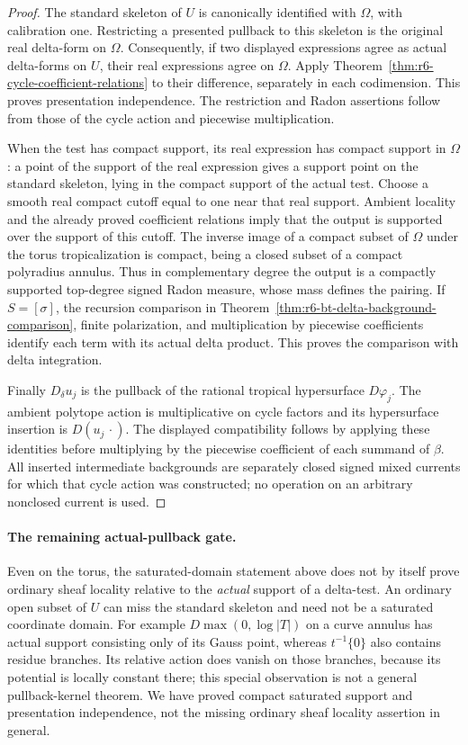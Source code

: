 \documentclass[11pt,a4paper]{article}
\numberwithin{equation}{section}
\theoremstyle{definition}
\theoremstyle{remark}
\begin{document}
\begin{proof}
The standard skeleton of $U$ is canonically identified with
$\Omega$, with calibration one.  Restricting a presented pullback
to this skeleton is the original real delta-form on $\Omega$.
Consequently, if two displayed expressions agree as actual
delta-forms on $U$, their real expressions agree on $\Omega$.
Apply Theorem~\ref{thm:r6-cycle-coefficient-relations} to their
difference, separately in each codimension.  This proves
presentation independence.  The restriction and Radon assertions
follow from those of the cycle action and piecewise multiplication.

When the test has compact support, its real expression has compact
support in $\Omega$: a point of the support of the real expression
gives a support point on the standard skeleton, lying in the
compact support of the actual test.  Choose a smooth real compact
cutoff equal to one near that real support.  Ambient locality and
the already proved coefficient relations imply that the output is
supported over the support of this cutoff.  The inverse image of
a compact subset of $\Omega$ under the torus tropicalization is
compact, being a closed subset of a compact polyradius annulus.
Thus in complementary degree the output is a compactly supported
top-degree signed Radon measure, whose mass defines the pairing.
If $S=[\sigma]$, the recursion
comparison in Theorem~\ref{thm:r6-bt-delta-background-comparison},
finite polarization, and multiplication by piecewise coefficients
identify each term with its actual delta product.  This proves the
comparison with delta integration.

Finally $D_\delta u_j$ is the pullback of the rational tropical
hypersurface $D\varphi_j$.  The ambient polytope action is
multiplicative on cycle factors and its hypersurface insertion is
$D(u_j\,\cdot)$.  The displayed compatibility follows by applying
these identities before multiplying by the piecewise coefficient
of each summand of $\beta$.  All inserted intermediate backgrounds
are separately closed signed mixed currents for which that cycle
action was constructed; no operation on an arbitrary nonclosed
current is used.
\end{proof}

\paragraph{The remaining actual-pullback gate.}
Even on the torus, the saturated-domain statement above does not
by itself prove ordinary sheaf locality relative to the
\emph{actual} support of a delta-test.  An ordinary open subset
of $U$ can miss the standard skeleton and need not be a saturated
coordinate domain.  For example $D\max(0,\log|T|)$ on a curve
annulus has actual support consisting only of its Gauss point,
whereas $t^{-1}\{0\}$ also contains residue branches.  Its relative
action does vanish on those branches, because its potential is
locally constant there; this special observation is not a general
pullback-kernel theorem.  We have proved compact saturated support
and presentation independence, not the missing ordinary sheaf
locality assertion in general.
\end{document}
